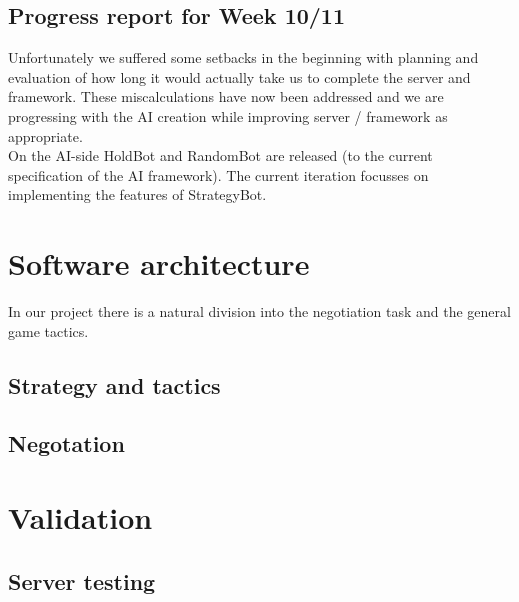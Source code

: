 \documentclass[11pt]{article} \usepackage{fullpage} \usepackage{cite}
\begin{document}
\subsection{Progress report for Week 10/11}
Unfortunately we suffered some setbacks in the beginning with planning and
evaluation of how long it would actually take us to complete the server and
framework. These miscalculations have now been addressed and we are progressing
with the AI creation while improving server / framework as appropriate.  \\ On
the AI-side HoldBot and RandomBot are released (to the current specification of
the AI framework). The current iteration focusses on implementing the features
of StrategyBot.


\section{Software architecture}

In our project there is a natural division into the negotiation task and the
general game tactics.

\subsection{Strategy and tactics}



\subsection{Negotation}

\section{Validation}

\subsection{Server testing}
\end{document}
